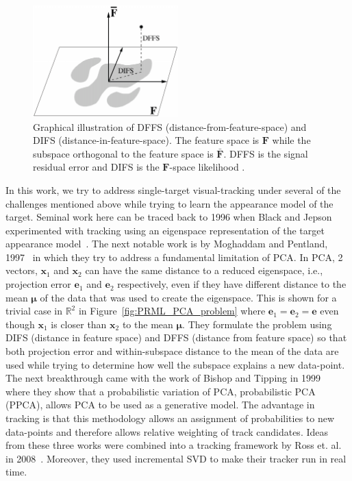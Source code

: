 								\begin{figure}[t]
								\centering
								\includegraphics[width=0.5\textwidth]{thesis/1998_JNL_ProbVisLearning_Moghaddam_fig3.png}
								\caption{Graphical illustration of DFFS (distance-from-feature-space) and DIFS (distance-in-feature-space).  The feature space is $\mathbf{F}$ while the subspace orthogonal to the feature space is $\bar{\mathbf{F}}$.  DFFS is the signal residual error and DIFS is the $\mathbf{F}$-space likelihood \cite{1997_JNL_EigenTRK_Moghaddam}.}
					\label{fig:1997_JNL_DIFSDFFS_Moghaddam}
								\end{figure}

In this work, we try to address single-target visual-tracking under several of the challenges mentioned above while trying to learn the appearance model of the target.  Seminal work here can be traced back to 1996 when Black and Jepson experimented with tracking using an eigenspace representation of the target appearance model~\cite{1998_JNL_Eigentracking_Black}.  The next notable work is by Moghaddam and Pentland, 1997~\cite{1997_JNL_EigenTRK_Moghaddam} in which they try to address a fundamental limitation of PCA.  In PCA, 2 vectors, $\mathbf{x}_1$ and $\mathbf{x}_2$ can have the same distance to a reduced eigenspace, i.e., projection error $\mathbf{e}_1$ and $\mathbf{e}_2$ respectively, even if they have different distance to the mean $\boldsymbol\mu$ of the data that was used to create the eigenspace.  This is shown for a trivial case in $\mathbb{R}^2$ in Figure~\ref{fig:PRML_PCA_problem} where $\mathbf{e}_1=\mathbf{e}_2=\mathbf{e}$ even though $\mathbf{x}_1$ is closer than $\mathbf{x}_2$ to the mean $\boldsymbol\mu$.  They formulate the problem using DIFS (distance in feature space) and DFFS (distance from feature space) so that both projection error and within-subspace distance to the mean of the data are used while trying to determine how well the subspace explains a new data-point.  The next breakthrough came with the work of Bishop and Tipping in 1999~\cite{1999_JNL_PPCA_Tipping} where they show that a probabilistic variation of PCA, probabilistic PCA (PPCA), allows PCA to be used as a generative model.  The advantage in tracking is that this methodology allows an assignment of probabilities to new data-points and therefore allows relative weighting of track candidates.  Ideas from these three works were combined into a tracking framework by Ross et. al. in 2008~\cite{2008_JNL_subspaceTRK_Ross}.  Moreover, they used incremental SVD to make their tracker run in real time.  

